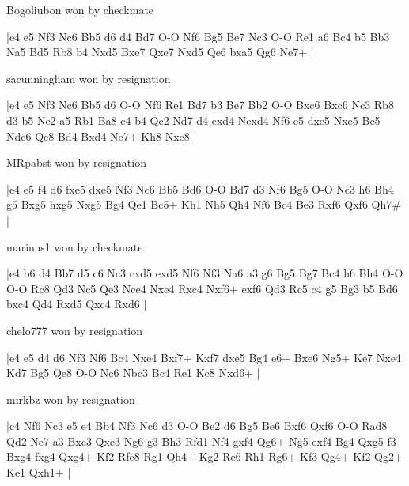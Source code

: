 \showboard

Bogoliubon won by checkmate

\makegametitle
|e4 e5 Nf3 Nc6 Bb5 d6 d4 Bd7 O-O Nf6 Bg5 Be7 Nc3 O-O Re1 a6 Bc4 b5 Bb3 Na5 Bd5 Rb8 b4 Nxd5 Bxe7 Qxe7 Nxd5 Qe6 bxa5 Qg6 Ne7+  |

\showboard

sacunningham won by resignation

\makegametitle
|e4 e5 Nf3 Nc6 Bb5 d6 O-O Nf6 Re1 Bd7 b3 Be7 Bb2 O-O Bxc6 Bxc6 Nc3 Rb8 d3 b5 Ne2 a5 Rb1 Ba8 c4 b4 Qc2 Nd7 d4 exd4 Nexd4 Nf6 e5 dxe5 Nxe5 Bc5 Ndc6 Qc8 Bd4 Bxd4 Ne7+ Kh8 Nxc8  |

\showboard

MRpabst won by resignation

\makegametitle
|e4 e5 f4 d6 fxe5 dxe5 Nf3 Nc6 Bb5 Bd6 O-O Bd7 d3 Nf6 Bg5 O-O Nc3 h6 Bh4 g5 Bxg5 hxg5 Nxg5 Bg4 Qe1 Bc5+ Kh1 Nh5 Qh4 Nf6 Bc4 Be3 Rxf6 Qxf6 Qh7\#  |

\showboard

marinus1 won by checkmate

\makegametitle
|e4 b6 d4 Bb7 d5 c6 Nc3 cxd5 exd5 Nf6 Nf3 Na6 a3 g6 Bg5 Bg7 Bc4 h6 Bh4 O-O O-O Rc8 Qd3 Nc5 Qe3 Nce4 Nxe4 Rxc4 Nxf6+ exf6 Qd3 Rc5 c4 g5 Bg3 b5 Bd6 bxc4 Qd4 Rxd5 Qxc4 Rxd6  |

\showboard

chelo777 won by resignation

\makegametitle
|e4 e5 d4 d6 Nf3 Nf6 Bc4 Nxe4 Bxf7+ Kxf7 dxe5 Bg4 e6+ Bxe6 Ng5+ Ke7 Nxe4 Kd7 Bg5 Qe8 O-O Nc6 Nbc3 Bc4 Re1 Kc8 Nxd6+  |

\showboard

mirkbz won by resignation

\makegametitle
|c4 Nf6 Nc3 e5 e4 Bb4 Nf3 Nc6 d3 O-O Be2 d6 Bg5 Be6 Bxf6 Qxf6 O-O Rad8 Qd2 Ne7 a3 Bxc3 Qxc3 Ng6 g3 Bh3 Rfd1 Nf4 gxf4 Qg6+ Ng5 exf4 Bg4 Qxg5 f3 Bxg4 fxg4 Qxg4+ Kf2 Rfe8 Rg1 Qh4+ Kg2 Re6 Rh1 Rg6+ Kf3 Qg4+ Kf2 Qg2+ Ke1 Qxh1+  |

\showboard

